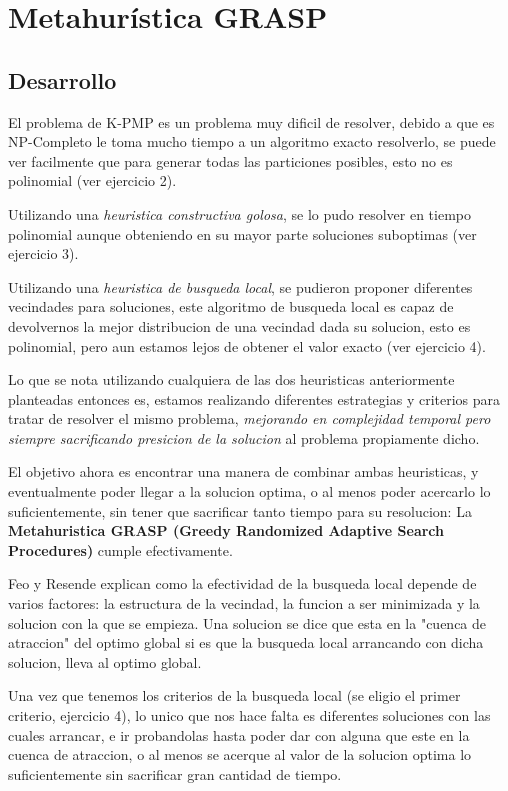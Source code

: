 \section{Metahurística GRASP}
\subsection{Desarrollo}
El problema de K-PMP es un problema muy dificil de resolver, debido a que es NP-Completo le toma mucho tiempo a un algoritmo exacto resolverlo, se puede ver facilmente que para generar todas las particiones posibles, esto no es polinomial (ver ejercicio 2).

Utilizando una \textit{heuristica constructiva golosa}, se lo pudo resolver en tiempo polinomial aunque obteniendo en su mayor parte soluciones suboptimas  (ver ejercicio 3).

Utilizando una \textit{heuristica de busqueda local}, se pudieron proponer diferentes vecindades para soluciones, este algoritmo de busqueda local es capaz de devolvernos la mejor distribucion de una vecindad dada su solucion, esto es polinomial, pero aun estamos lejos de obtener el valor exacto (ver ejercicio 4).

Lo que se nota utilizando cualquiera de las dos heuristicas anteriormente planteadas entonces es, estamos realizando diferentes estrategias y criterios para tratar de resolver el mismo problema, \textit{mejorando en complejidad temporal pero siempre  sacrificando presicion de la solucion} al problema propiamente dicho.

El objetivo ahora es encontrar una manera de combinar ambas heuristicas, y eventualmente poder llegar a la solucion optima, o al menos poder acercarlo lo suficientemente, sin tener que sacrificar tanto tiempo para su resolucion: La \textbf{Metahuristica GRASP (Greedy Randomized Adaptive Search Procedures)} cumple efectivamente.

Feo y Resende explican como la efectividad de la busqueda local depende de varios factores: la estructura de la vecindad, la funcion a ser minimizada y la solucion con la que se empieza. Una solucion se dice que esta en la "cuenca de atraccion" del optimo global si es que la busqueda local arrancando con dicha solucion, lleva al optimo global.

Una vez que tenemos los criterios de la busqueda local (se eligio el primer criterio, ejercicio 4), lo unico que nos hace falta es diferentes soluciones con las cuales arrancar, e ir probandolas hasta poder dar con alguna que este en la cuenca de atraccion, o al menos se acerque al valor de la solucion optima lo suficientemente sin sacrificar gran cantidad de tiempo.


